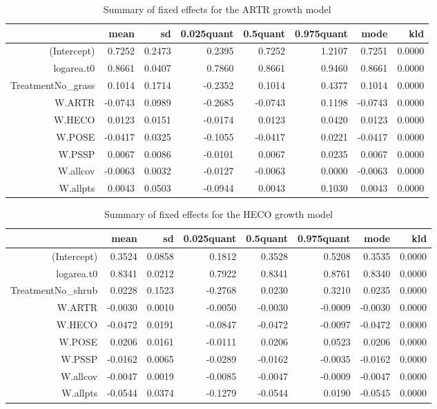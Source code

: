 \begin{table}[ht]
\centering
\caption{Summary of fixed effects for the ARTR growth model} 
\label{ARTRgrowth}
\begin{tabular}{rrrrrrrr}
  \hline
 & mean & sd & 0.025quant & 0.5quant & 0.975quant & mode & kld \\ 
  \hline
(Intercept) & 0.7252 & 0.2473 & 0.2395 & 0.7252 & 1.2107 & 0.7251 & 0.0000 \\ 
  logarea.t0 & 0.8661 & 0.0407 & 0.7860 & 0.8661 & 0.9460 & 0.8661 & 0.0000 \\ 
  TreatmentNo\_grass & 0.1014 & 0.1714 & -0.2352 & 0.1014 & 0.4377 & 0.1014 & 0.0000 \\ 
  W.ARTR & -0.0743 & 0.0989 & -0.2685 & -0.0743 & 0.1198 & -0.0743 & 0.0000 \\ 
  W.HECO & 0.0123 & 0.0151 & -0.0174 & 0.0123 & 0.0420 & 0.0123 & 0.0000 \\ 
  W.POSE & -0.0417 & 0.0325 & -0.1055 & -0.0417 & 0.0221 & -0.0417 & 0.0000 \\ 
  W.PSSP & 0.0067 & 0.0086 & -0.0101 & 0.0067 & 0.0235 & 0.0067 & 0.0000 \\ 
  W.allcov & -0.0063 & 0.0032 & -0.0127 & -0.0063 & 0.0000 & -0.0063 & 0.0000 \\ 
  W.allpts & 0.0043 & 0.0503 & -0.0944 & 0.0043 & 0.1030 & 0.0043 & 0.0000 \\ 
   \hline
\end{tabular}
\end{table}

\begin{table}[ht]
\centering
\caption{Summary of fixed effects for the HECO growth model} 
\label{HECOgrowth}
\begin{tabular}{rrrrrrrr}
  \hline
 & mean & sd & 0.025quant & 0.5quant & 0.975quant & mode & kld \\ 
  \hline
(Intercept) & 0.3524 & 0.0858 & 0.1812 & 0.3528 & 0.5208 & 0.3535 & 0.0000 \\ 
  logarea.t0 & 0.8341 & 0.0212 & 0.7922 & 0.8341 & 0.8761 & 0.8340 & 0.0000 \\ 
  TreatmentNo\_shrub & 0.0228 & 0.1523 & -0.2768 & 0.0230 & 0.3210 & 0.0235 & 0.0000 \\ 
  W.ARTR & -0.0030 & 0.0010 & -0.0050 & -0.0030 & -0.0009 & -0.0030 & 0.0000 \\ 
  W.HECO & -0.0472 & 0.0191 & -0.0847 & -0.0472 & -0.0097 & -0.0472 & 0.0000 \\ 
  W.POSE & 0.0206 & 0.0161 & -0.0111 & 0.0206 & 0.0523 & 0.0206 & 0.0000 \\ 
  W.PSSP & -0.0162 & 0.0065 & -0.0289 & -0.0162 & -0.0035 & -0.0162 & 0.0000 \\ 
  W.allcov & -0.0047 & 0.0019 & -0.0085 & -0.0047 & -0.0009 & -0.0047 & 0.0000 \\ 
  W.allpts & -0.0544 & 0.0374 & -0.1279 & -0.0544 & 0.0190 & -0.0545 & 0.0000 \\ 
   \hline
\end{tabular}
\end{table}

